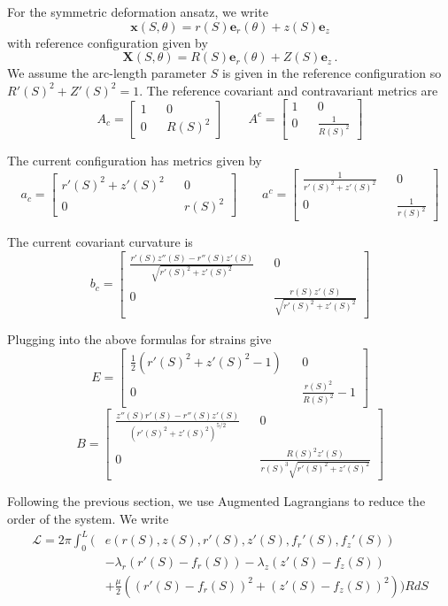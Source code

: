 \documentclass[11pt]{article}
\theoremstyle{plain}
\theoremstyle{definition}
\begin{document}
For the symmetric deformation ansatz, we write 
\[
\mathbf{x}(S,\theta) = r(S) \mathbf{e}_r(\theta) + z(S) \mathbf{e}_z
\]
with reference configuration given by
\[
\mathbf{X}(S,\theta) = R(S) \mathbf{e}_r(\theta) + Z(S) \mathbf{e}_z\, .
\]
We assume the arc-length parameter $S$ is given in the reference configuration so $R'(S)^2 + Z'(S)^2 = 1$. The reference covariant and contravariant metrics are
\[
A_c = \begin{bmatrix}
1 && 0 \\
0 && R(S)^2
\end{bmatrix} \quad \quad A^c = \begin{bmatrix}
1 && 0 \\
0 && \frac{1}{R(S)^2}
\end{bmatrix}
\]

The current configuration has metrics given by
\[
a_c = \begin{bmatrix}
r'(S)^2 + z'(S)^2 && 0 \\
0 && r(S)^2
\end{bmatrix} \quad \quad a^c = \begin{bmatrix}
\frac{1}{r'(S)^2 + z'(S)^2} && 0 \\
0 && \frac{1}{r(S)^2}
\end{bmatrix}
\]

The current covariant curvature is
\[
b_c = \begin{bmatrix}
\frac{r'(S) z''(S) - r''(S) z'(S)}{\sqrt{r'(S)^2 + z'(S)^2}} && 0 \\
0 && \frac{r(S) z'(S)}{\sqrt{r'(S)^2 + z'(S)^2}}
\end{bmatrix}
\]

Plugging into the above formulas for strains give
\[
E = \begin{bmatrix}
\frac{1}{2} \left(r'(S)^2 + z'(S)^2 - 1 \right) && 0 \\
0 && \frac{r(S)^2}{R(S)^2} - 1
\end{bmatrix}
\]
\[
B = \begin{bmatrix}
\frac{z''(S) r'(S) - r''(S)z'(S)}{(r'(S)^2 + z'(S)^2)^{5/2}} && 0 \\
0 && \frac{R(S)^2 z'(S)}{r(S)^3\sqrt{r'(S)^2 + z'(S)^2}}
\end{bmatrix}
\]

Following the previous section, we use Augmented Lagrangians to reduce the order of the system. We write
\[
\begin{split}
\mathcal{L} = 2 \pi \int_0^L (& e(r(S),z(S),r'(S),z'(S),f_r'(S),f_z'(S))\\
 & - \lambda_r (r'(S) - f_r(S)) - \lambda_z (z'(S) - f_z(S)) \\
 & +\frac{\mu}{2} ((r'(S) - f_r(S))^2 + (z'(S) - f_z(S))^2) ) R dS
\end{split}
\]
\end{document}
